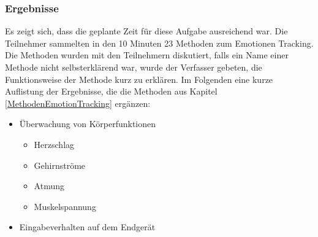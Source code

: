 \vspace{2mm}
\subsubsection*{Ergebnisse}
Es zeigt sich, dass die geplante Zeit für diese Aufgabe ausreichend war. Die Teilnehmer sammelten in den 10 Minuten 23 Methoden zum Emotionen Tracking. Die Methoden wurden mit den Teilnehmern diskutiert, falls ein Name einer Methode nicht selbsterklärend war, wurde der Verfasser gebeten, die Funktionsweise der Methode kurz zu erklären. Im Folgenden eine kurze Auflistung der Ergebnisse, die die Methoden aus Kapitel \ref{MethodenEmotionTracking} ergänzen:

\begin{itemize}
	\item Überwachung von Körperfunktionen
	\begin{itemize}
		\item Herzschlag
		\item Gehirnströme
		\item Atmung
		\item Muskelspannung
	\end{itemize}
	\item Eingabeverhalten auf dem Endgerät	
\end{itemize}

